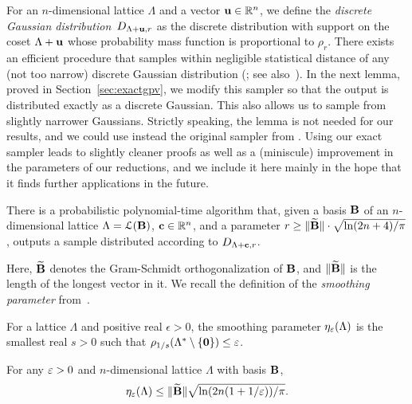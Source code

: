 For an $n$-dimensional lattice $\Lambda$ and a vector $\mathbf{u} \in \mathbb{R}^n$, we define the \emph{discrete Gaussian distribution}~$D_{\Lambda+\mathbf{u},r}$
as the discrete distribution with support on the coset $\Lambda+\mathbf{u}$ whose probability mass function is proportional to
$\rho_r$. There exists an efficient procedure that samples within negligible statistical distance of any (not too narrow) discrete Gaussian distribution 
(\cite[Theorem~4.1]{DBLP:conf/stoc/GentryPV08}; see also~\cite{DBLP:conf/crypto/Peikert10}). In the next lemma, proved in Section~\ref{sec:exactgpv},
we modify this sampler so that the output is distributed exactly as a discrete Gaussian. This also allows us to sample from
slightly narrower Gaussians. Strictly speaking, the lemma is not needed for our results,
and we could use instead the original sampler from \cite{DBLP:conf/stoc/GentryPV08}. Using our exact sampler leads to slightly
cleaner proofs as well as a (miniscule) improvement in the parameters of our reductions, and we include it here mainly in the hope that it finds
further applications in the future.

\begin{lemma}\label{lem:gpv}
There is a probabilistic polynomial-time algorithm that, given a basis $\mathbf{B}$ of an $n$-dimensional
lattice $\Lambda = \mathcal{L}(\mathbf{B})$, $\mathbf{c} \in \mathbb{R}^n$, and a parameter $r \ge \|\widetilde {\mathbf{B}}\| \cdot \sqrt{\ln(2n+4)/\pi}$,
outputs a sample distributed according to $D_{\Lambda+\mathbf{c},r}$. 
\end{lemma}

Here, $\widetilde {\mathbf{B}}$ denotes the Gram-Schmidt orthogonalization of $\mathbf{B}$,
and $\|\widetilde {\mathbf{B}}\|$ is the length of the longest vector in it.
We recall the definition of the \emph{smoothing parameter} from~\cite{DBLP:journals/siamcomp/MicciancioR07}.

\begin{definition}
  \label{def:smoothing}
  For a lattice $\Lambda$ and positive real $\epsilon > 0$, the
  smoothing parameter $\eta_{\varepsilon}(\Lambda)$ is the smallest real $s >
  0$ such that $\rho_{1/s}(\Lambda^* \setminus \{\mathbf{0}\}) \leq
  \varepsilon$.
\end{definition}

\begin{lemma}\label{lem:boundonsmoothing}
For any $\varepsilon>0$ and $n$-dimensional lattice $\Lambda$ with basis $\mathbf{B}$,
\[
\eta_{\varepsilon}(\Lambda) \le \|\widetilde {\mathbf{B}} \| \sqrt{\ln(2n(1+1/\varepsilon))/\pi}.
\]
\end{lemma}


